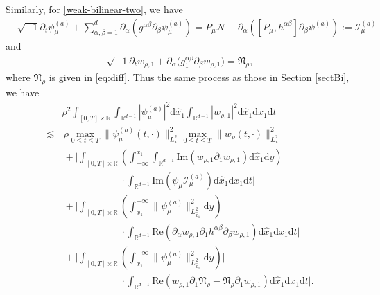 \documentclass[11pt,letterpaper,reqno]{amsart}
\numberwithin{equation}{section}
\theoremstyle{definition}
\theoremstyle{remark}
\newcommand{\pa}{\partial}
\begin{document}
Similarly, for \eqref{weak-bilinear-two}, we have 
\begin{align*} 
	&\sqrt{-1} \pa_t \psi^{(a)}_\mu +\sum_{\alpha,\beta=1}^d \partial_{\alpha} (g^{\alpha \beta} \partial_{ \beta}  \psi^{(a)}_\mu )=P_\mu \mathcal{N}- \partial_{\alpha}  ( [P_\mu, h^{\alpha \beta} ]  \partial_\beta  \psi^{(a)} ):= \mathcal{I}_\mu^{(a)} 
\end{align*}
and
 \begin{align*} 
	  \sqrt{-1}\partial_t w_{\rho,1}
+\partial_\alpha\big(g^{\alpha\beta}_{1 }\partial_\beta w_{\rho,1}\big)
 = \mathfrak{N}_\rho,  
\end{align*}
where \(\mathfrak{N}_\rho\) is given in \eqref{eq:diff}.
Thus the same process as those in Section \ref{sectBi}, we have
\begin{align}
& \rho^2 \int_{[0,T]\times \mathbb{R}} \int_{\mathbb{R}^{d-1}} |  \psi_\mu^{(a)}   |^2 	\mathrm{d} \widehat{x}_1 \int_{\mathbb{R}^{d-1}} |  w_{\rho,1} |^2 \mathrm{d} \widehat{x}_1 \mathrm{ d} x_1 \mathrm{ d} t \nonumber \\
\lesssim &\,\rho \max_{0\leq t \leq T} \| \psi_\mu^{(a)} (t, \cdot) \|_{  L_x^2}^2  \max_{0\leq t \leq T} \|    w_\rho(t,\cdot )\|_{ L_x^2}^2 \label{1biNt0}\\
	&\,+\Big|\int_{[0,T]\times \mathbb{R}}  \left( \int_{-\infty}^{x_1} \int_{\mathbb{R}^{d-1}}  \mathrm{Im}\left( w_{\rho,1 }  \partial_{1} \overline{w}_{\rho,1} \right) 
 \mathrm{d} \widehat{x}_1 \mathrm{ d} y\right) \label{1non.uni.bit1}\\
 &\qquad\qquad\qquad  \cdot\int_{\mathbb{R}^{d-1}} \mathrm{Im} \left( \overline{ \psi}_\mu  \mathcal{I}_\mu^{(a)}    \right) \mathrm{d} \widehat{x}_1 \mathrm{ d} x_1 \mathrm{ d} t\Big| \nonumber\\
	&\,+\Big|\int_{[0,T]\times \mathbb{R}}  \left( \int^{+\infty}_{x_1}   \big\|\psi_\mu^{(a)}\big\|^2_{L^2_{\widehat{x}_1}}   \mathrm{ d} y\right )\label{1non.uni.bit2}\\
 &\qquad\qquad\qquad  \cdot\int_{\mathbb{R}^{d-1}}  \mathrm{Re}\left(\partial_{\alpha} w_{\rho,1}    \partial_1 h^{\alpha \beta} \partial_\beta \overline{w}_{\rho,1}\right)  \mathrm{d} \widehat{x}_1\mathrm{ d} x_1 \mathrm{ d} t \Big|\nonumber\\
	&\,+\Big|\int_{[0,T]\times \mathbb{R}}  \left( \int^{+\infty}_{x_1}   \big\|\psi_\mu^{(a)}\big\|^2_{L^2_{\widehat{x}_1}}   \mathrm{ d} y\right) 
 \Big|\label{1non.uni.bit3}\\
	&\qquad\qquad\qquad  \cdot \int_{\mathbb{R}^{d-1}} \mathrm{Re} \left(\overline{w}_{\rho,1}  \partial_{1} \mathfrak{N}_\rho  - \mathfrak{N}_\rho  \partial_{1} \overline{w}_{\rho,1} \right)   \mathrm{d} \widehat{x}_1 \mathrm{ d} x_1 \mathrm{ d} t \Big|. \nonumber
\end{align}
\end{document}
